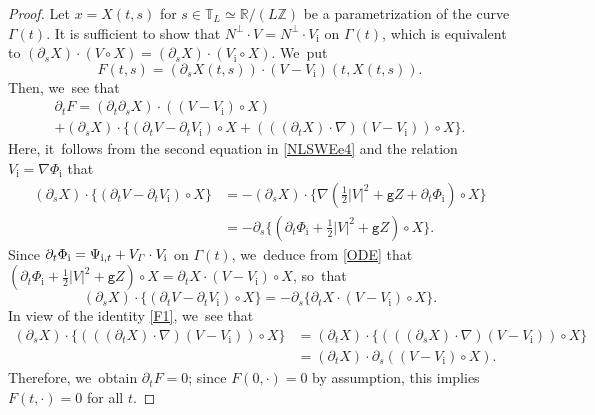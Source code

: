\documentclass[JEP,XML,SOM,Unicode,NoFloatCountersInSection,published]{cedram}
\newcommand{\gr}{{\mathtt g}}
\newcommand{\R}{{\mathbb R}}
\newcommand{\dt}{\partial_t}
\newcommand{\itGamma}{\mathit{\Gamma}}
\theoremstyle{definition}
\begin{document}
\begin{proof}
Let $x=X(t,s)$ for $s\in\mathbb{T}_L\simeq\R/(L\mathbb{Z})$ be a parametrization of the curve $\itGamma(t)$.
It is sufficient to show that $N^\perp\cdot V=N^\perp\cdot V_\mathrm{i}$ on $\itGamma(t)$, which is equivalent to
$(\partial_s X)\cdot(V\circ X)=(\partial_s X)\cdot(V_\mathrm{i}\circ X)$. We~put
\[
F(t,s)=(\partial_s X(t,s))\cdot(V-V_\mathrm{i})(t,X(t,s)).
\]
Then, we~see that
\begin{multline*}
\dt F= (\dt\partial_s X)\cdot ((V-V_\mathrm{i})\circ X) \\
+ (\partial_s X)\cdot\{ (\dt V-\dt V_\mathrm{i})\circ X + (((\dt X)\cdot\nabla)(V-V_\mathrm{i}))\circ X \}.
\end{multline*}
Here, it~follows from the second equation in \eqref{NLSWEe4} and the relation $V_\mathrm{i}=\nabla\Phi_\mathrm{i}$ that
\begin{align*}
(\partial_s X)\cdot \{ (\dt V-\dt V_\mathrm{i})\circ X \}
&= - (\partial_s X)\cdot \{ \nabla(\tfrac12|V|^2+\gr Z+\dt\Phi_\mathrm{i})\circ X \} \\
&= - \partial_s \{ (\dt\Phi_\mathrm{i}+\tfrac12|V|^2+\gr Z)\circ X \}.
\end{align*}
Since $\dt \Phi_\mathrm{i}=\Psi_{{\rm i},t}+V_{\itGamma}\cdot V_\mathrm{i}$ on $\itGamma(t)$, we~deduce from \eqref{ODE} that $(\dt\Phi_\mathrm{i}+\tfrac12|V|^2+\gr Z)\circ X=\partial_t X\cdot(V-V_\mathrm{i})\circ X$, so~that
\[
(\partial_s X)\cdot \{ (\dt V-\dt V_\mathrm{i})\circ X \}= - \partial_s \{ \partial_t X\cdot(V-V_\mathrm{i})\circ X\}.
\]
In view of the identity \eqref{F1}, we~see that
\begin{align*}
(\partial_s X)\cdot\{ (((\dt X)\cdot\nabla)(V-V_\mathrm{i}))\circ X \}
&= (\dt X)\cdot\{ (((\partial_s X)\cdot\nabla)(V-V_\mathrm{i}))\circ X \} \\
&= (\dt X)\cdot \partial_s((V-V_\mathrm{i})\circ X).
\end{align*}
Therefore, we~obtain $\dt F=0$; since $F(0,\cdot)=0$ by assumption, this implies $F(t,\cdot)=0$ for all $t$.
\end{proof}
\end{document}
